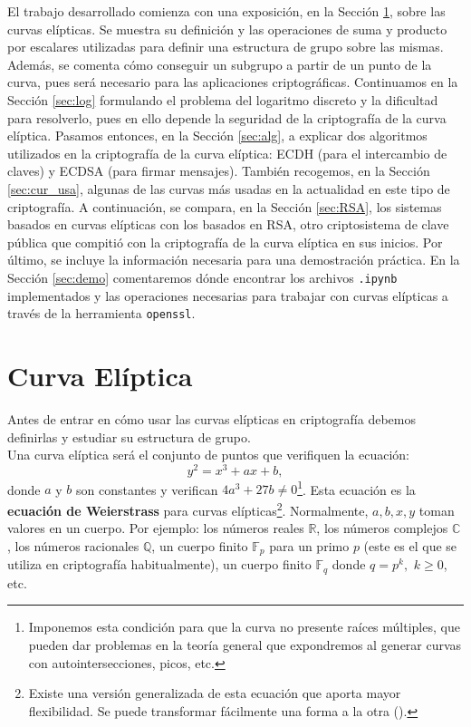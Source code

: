 \documentclass[11pt]{article}
\begin{document}
El trabajo desarrollado comienza con una exposición, en la Sección \ref{sec:curva}, sobre las curvas elípticas. Se muestra su definición y las operaciones de suma y producto por escalares utilizadas para definir una estructura de grupo sobre las mismas. Además, se comenta cómo conseguir un subgrupo a partir de un punto de la curva, pues será necesario para las aplicaciones criptográficas. Continuamos en la Sección \ref{sec:log} formulando el problema del logaritmo discreto y la dificultad para resolverlo, pues en ello depende la seguridad de la criptografía de la curva elíptica. Pasamos entonces, en la Sección \ref{sec:alg}, a explicar dos algoritmos utilizados en la criptografía de la curva elíptica: ECDH (para el intercambio de claves) y ECDSA (para firmar mensajes). También recogemos, en la Sección \ref{sec:cur_usa}, algunas de las curvas más usadas en la actualidad en este tipo de criptografía.
A continuación, se compara, en la Sección \ref{sec:RSA}, los sistemas basados en curvas elípticas con los basados en RSA, otro criptosistema de clave pública que compitió con la criptografía de la curva elíptica en sus inicios. Por último, se incluye la información necesaria para una demostración práctica. En la Sección \ref{sec:demo} comentaremos dónde encontrar los archivos \texttt{.ipynb} implementados y las operaciones necesarias para trabajar con curvas elípticas a través de la herramienta \texttt{openssl}.\\

\section{Curva Elíptica}
\label{sec:curva}
Antes de entrar en cómo usar las curvas elípticas en criptografía debemos definirlas y estudiar su estructura de grupo.\\

Una curva elíptica será el conjunto de puntos que verifiquen la ecuación:
\[y^2 = x^3 + ax + b,\]
donde $a$ y $b$ son constantes y verifican $4a^3+27b \neq 0$\footnote{Imponemos esta condición para que la curva no presente raíces múltiples, que pueden dar problemas en la teoría general que expondremos al generar curvas con autointersecciones, picos, etc. }. Esta ecuación es la \textbf{ecuación de Weierstrass} para curvas elípticas\footnote{Existe una versión generalizada de esta ecuación que aporta mayor flexibilidad. Se puede transformar fácilmente una forma a la otra (\cite{washington_elliptic_2008}).}. Normalmente, $a, b, x, y$ toman valores en un cuerpo. Por ejemplo: los números reales $\mathbb{R}$, los números complejos $\mathbb{C}$, los números racionales $\mathbb{Q}$, un cuerpo finito $\mathbb{F}_p$ para un primo $p$ (este es el que se utiliza en criptografía habitualmente), un cuerpo finito $\mathbb{F}_q$ donde $q = p^k,$ $k \ge 0$, etc.\\
\end{document}
